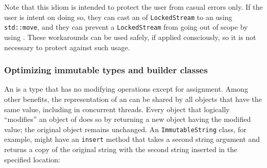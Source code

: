Note that this idiom is intended to protect the user from casual errors
only. If the user is intent on doing so, they can cast an 
of \lstinline!LockedStream! to an  using \lstinline!std::move!,
and they can prevent a \lstinline!LockedStream! from going out of scope by
using . These workarounds can be used safely,
if applied consciously, so it is not necessary to protect against such
usage.

\subsubsection[Optimizing immutable types and builder classes]{Optimizing immutable types and builder classes}\label{optimizing-immutable-types-and-builder-classes}

An  is a type that has no modifying operations
except for assignment. Among other benefits, the representation of an
 can be shared by all objects that have the same
value, including in concurrent threads. Every object that logically
``modifies'' an object of  does so by returning a
new object having the modified value; the original object remains
unchanged. An \lstinline!ImmutableString! class, for example, might have an
\lstinline!insert! method that takes a second string argument and returns a
copy of the original string with the second string inserted in the
specified location:

